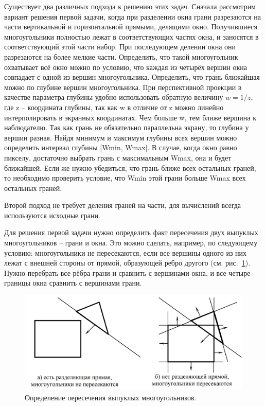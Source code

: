 Существует два различных подхода к решению этих задач. Сначала
рассмотрим вариант решения первой задачи, когда при разделении окна
грани разрезаются на части вертикальной и горизонтальной прямыми, делящими окно. Получившиеся многоугольники полностью лежат в соответствующих частях окна, и заносятся в соответствующий этой части набор.
При последующем делении окна они разрезаются на более мелкие части.
Определить, что такой многоугольник охватывает всё окно можно по условию, что каждая из четырёх вершин окна совпадает с одной из вершин
многоугольника. Определить, что грань ближайшая можно по глубине
вершин многоугольника. При перспективной проекции в качестве параметра глубины удобно использовать обратную величину \(w = 1/z\), где z – координата глубины, так как w в отличие от z можно линейно интерполировать в экранных координатах. Чем больше w, тем ближе вершина к наблюдателю. Так как грань не обязательно параллельна экрану, то глубина у
вершин разная. Найдя минимум и максимум глубины всех вершин можно
определить интервал глубины [Wmin, Wmax]. В случае, когда окно равно
пикселу, достаточно выбрать грань с максимальным Wmax, она и будет
ближайшей. Если же нужно убедиться, что грань ближе всех остальных
граней, то необходимо проверить условие, что Wmin этой грани больше
Wmax всех остальных граней.

Второй подход не требует деления граней на части, для вычислений
всегда используются исходные грани.

Для решения первой задачи нужно определить факт пересечения
двух выпуклых многоугольников – грани и окна. Это можно сделать, например, по следующему условию: многоугольники не пересекаются, если
все вершины одного из них лежат с внешней стороны от прямой, образующей ребро другого (см. рис.~\ref{fig:varnak_algorithm_2}). Нужно перебрать все рёбра грани и сравнить с вершинами окна, и все четыре границы окна сравнить с вершинами грани.

\begin{figure}[H]
    \centering
    \includegraphics[width=\textwidth]{img/varnak_algorithm_2.png}
    \caption{Определение пересечения выпуклых многоугольников.}
    \label{fig:varnak_algorithm_2}
\end{figure}

